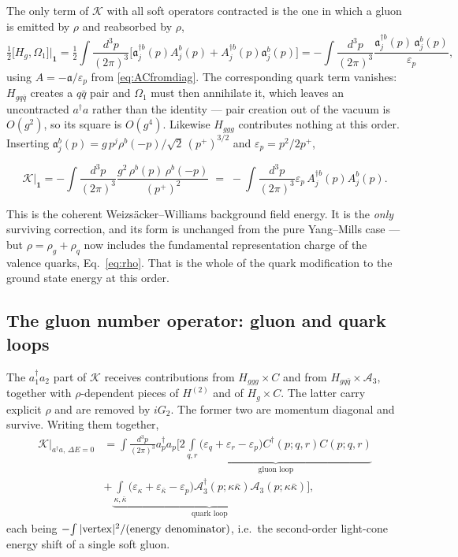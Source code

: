 \documentclass[11pt]{article}
\newcommand{\eps}{\varepsilon}
\newcommand{\dg}{\dagger}
\newcommand{\ip}[1]{\int\!\frac{d^{3}#1}{(2\pi)^{3}}}
\newcommand{\OM}{\Omega}
\newcommand{\A}{\mathcal{A}}
\begin{document}
The only term of $\mathcal K$ with all soft operators contracted is the one in which a gluon is
emitted by $\rho$ and reabsorbed by $\rho$,
\begin{equation}
\tfrac12\big[H_{g},\OM_{1}\big]\Big|_{\mathbf 1}
=\tfrac12\ip{p}\Big[\mathfrak a^{\dg b}_{j}(p)A^{b}_{j}(p)+A^{\dg b}_{j}(p)\mathfrak a^{b}_{j}(p)\Big]
=-\ip{p}\frac{\mathfrak a^{\dg b}_{j}(p)\,\mathfrak a^{b}_{j}(p)}{\eps_{p}},
\end{equation}
using $A=-\mathfrak a/\eps_{p}$ from \eqref{eq:ACfromdiag}. The corresponding quark term vanishes:
$H_{gq\bar q}$ creates a $q\bar q$ pair and $\OM_{1}$ must then annihilate it, which leaves an
uncontracted $a^{\dg}a$ rather than the identity --- pair creation out of the vacuum is
$O(g^{2})$, so its square is $O(g^{4})$. Likewise $H_{ggg}$ contributes nothing at this order.
Inserting $\mathfrak a^{b}_{j}(p)=g\,p^{j}\rho^{b}(-p)/\sqrt2\,(p^{+})^{3/2}$ and
$\eps_{p}=p^{2}/2p^{+}$,
\begin{res}
\begin{equation}
\mathcal K\Big|_{\mathbf 1}
=-\ip{p}\frac{g^{2}\,\rho^{b}(p)\,\rho^{b}(-p)}{(p^{+})^{2}}
\;=\;-\ip{p}\eps_{p}\,A^{\dg b}_{j}(p)A^{b}_{j}(p) .
\label{eq:WW}
\end{equation}
\end{res}
\noindent
This is the coherent Weizs\"acker--Williams background field energy. It is the \emph{only}
surviving correction, and its form is unchanged from the pure Yang--Mills case --- but
$\rho=\rho_{g}+\rho_{q}$ now includes the fundamental representation charge of the valence
quarks, Eq.~\eqref{eq:rho}. That is the whole of the quark modification to the ground state energy
at this order.

\subsection{The gluon number operator: gluon and quark loops}

The $a^{\dg}_{1}a_{2}$ part of $\mathcal K$ receives contributions from $H_{ggg}\times C$ and
from $H_{gq\bar q}\times\A_{3}$, together with $\rho$-dependent pieces of $H^{(2)}$ and of
$H_{g}\times C$. The latter carry explicit $\rho$ and are removed by $iG_{2}$. The former two are
momentum diagonal and survive. Writing them together,
\begin{align}
\mathcal K\Big|_{a^{\dg}a,\,\Delta E=0}
&=\ip{p}a^{\dg}_{p}a_{p}\Big[\underbrace{2\!\!\int\limits_{q,r}\!\!\big(\eps_{q}+\eps_{r}-\eps_{p}\big)
C^{\dg}(p;q,r)C(p;q,r)}_{\text{gluon loop}}
\nonumber\\
&+\underbrace{\int\limits_{\kappa,\bar\kappa}\!\big(\eps_{\kappa}+\eps_{\bar\kappa}-\eps_{p}\big)
\A^{\dg}_{3}(p;\kappa\bar\kappa)\A_{3}(p;\kappa\bar\kappa)}_{\text{quark loop}}\Big],
\label{eq:loops}
\end{align}
each being $-\!\int|{\rm vertex}|^{2}/({\rm energy\ denominator})$, i.e.\ the second-order
light-cone energy shift of a single soft gluon.
\end{document}

